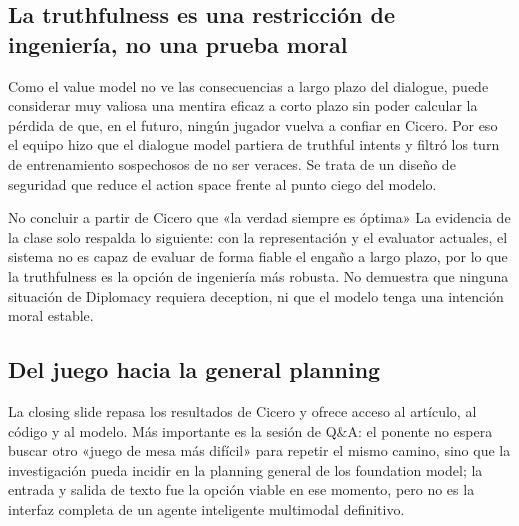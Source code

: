 \subsection{La truthfulness es una restricción de ingeniería, no una prueba moral}

Como el value model no ve las consecuencias a largo plazo del dialogue, puede considerar muy valiosa una mentira eficaz a corto plazo sin poder calcular la pérdida de que, en el futuro, ningún jugador vuelva a confiar en Cicero. Por eso el equipo hizo que el dialogue model partiera de truthful intents y filtró los turn de entrenamiento sospechosos de no ser veraces. Se trata de un diseño de seguridad que reduce el action space frente al punto ciego del modelo.

\begin{warningbox}{No concluir a partir de Cicero que «la verdad siempre es óptima»}
La evidencia de la clase solo respalda lo siguiente: con la representación y el evaluator actuales, el sistema no es capaz de evaluar de forma fiable el engaño a largo plazo, por lo que la truthfulness es la opción de ingeniería más robusta. No demuestra que ninguna situación de Diplomacy requiera deception, ni que el modelo tenga una intención moral estable.
\end{warningbox}


\subsection{Del juego hacia la general planning}

La closing slide repasa los resultados de Cicero y ofrece acceso al artículo, al código y al modelo. Más importante es la sesión de Q\&A: el ponente no espera buscar otro «juego de mesa más difícil» para repetir el mismo camino, sino que la investigación pueda incidir en la planning general de los foundation model; la entrada y salida de texto fue la opción viable en ese momento, pero no es la interfaz completa de un agente inteligente multimodal definitivo.

